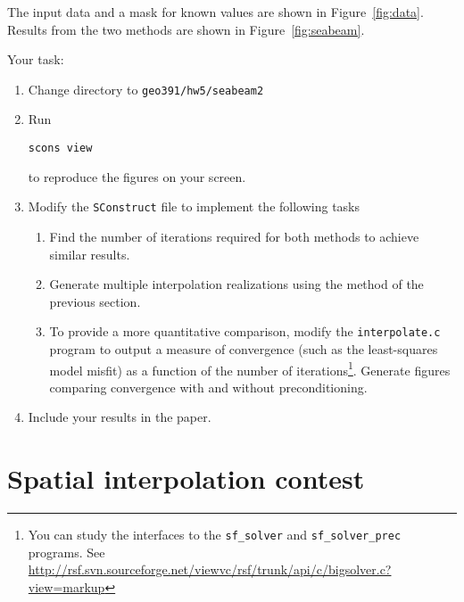 
The input data and a mask for known values are shown in
Figure~\ref{fig:data}. Results from the two methods are shown in Figure~\ref{fig:seabeam}.


\lstset{language=c,numbers=left,numberstyle=\tiny,showstringspaces=false}


\lstset{language=python,numbers=left,numberstyle=\tiny,showstringspaces=false}


Your task:
\begin{enumerate}
\item Change directory to \verb#geo391/hw5/seabeam2#
\item Run 
\begin{verbatim}
scons view
\end{verbatim}
to reproduce the figures on your screen.
\item Modify the \texttt{SConstruct} file to implement the following tasks
\begin{enumerate}
\item Find the number of iterations required for both methods to achieve similar results.
\item Generate multiple interpolation realizations using the method of the previous section.
\item To provide a more quantitative comparison, modify the
\texttt{interpolate.c} program to output a measure of convergence
(such as the least-squares model misfit) as a function of the number
of iterations\footnote{You can study the interfaces to
the \texttt{sf\_solver} and
\texttt{sf\_solver\_prec} programs. See
\url{http://rsf.svn.sourceforge.net/viewvc/rsf/trunk/api/c/bigsolver.c?view=markup}}. Generate figures comparing convergence with and without preconditioning.
\end{enumerate}
\item Include your results in the paper.
\end{enumerate}

\section{Spatial interpolation contest}

